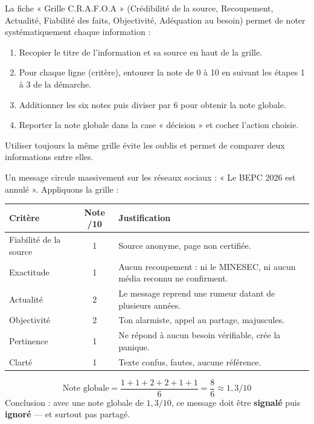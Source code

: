 \documentclass[11pt]{article}
\newcommand{\cle}[1]{{\popxbold\color{popdark}#1}}
\begin{document}
\begin{methode}
La fiche « Grille \cle{C.R.A.F.O.A} » (Crédibilité de la source, Recoupement, Actualité, Fiabilité des faits, Objectivité, Adéquation au besoin) permet de noter systématiquement chaque information :
\begin{enumerate}
  \item Recopier le titre de l'information et sa source en haut de la grille.
  \item Pour chaque ligne (critère), entourer la note de 0 à 10 en suivant les étapes 1 à 3 de la démarche.
  \item Additionner les six notes puis diviser par 6 pour obtenir la note globale.
  \item Reporter la note globale dans la case « décision » et cocher l'action choisie.
\end{enumerate}
Utiliser toujours la même grille évite les oublis et permet de comparer deux informations entre elles.
\end{methode}

\begin{exemplebox}
Un message circule massivement sur les réseaux sociaux : « Le BEPC 2026 est annulé ». Appliquons la grille :
\begin{center}
\begin{tabularx}{\linewidth}{|l|c|X|}
\hline
\rowcolor{popblueL} \textbf{Critère} & \textbf{Note /10} & \textbf{Justification} \\
\hline
Fiabilité de la source & 1 & Source anonyme, page non certifiée. \\
\hline
Exactitude & 1 & Aucun recoupement : ni le MINESEC, ni aucun média reconnu ne confirment. \\
\hline
Actualité & 2 & Le message reprend une rumeur datant de plusieurs années. \\
\hline
Objectivité & 2 & Ton alarmiste, appel au partage, majuscules. \\
\hline
Pertinence & 1 & Ne répond à aucun besoin vérifiable, crée la panique. \\
\hline
Clarté & 1 & Texte confus, fautes, aucune référence. \\
\hline
\end{tabularx}
\end{center}
\[
\text{Note globale} = \frac{1 + 1 + 2 + 2 + 1 + 1}{6} = \frac{8}{6} \approx 1{,}3/10
\]
Conclusion : avec une note globale de $1{,}3/10$, ce message doit être \textbf{signalé} puis \textbf{ignoré} — et surtout pas partagé.
\end{exemplebox}
\end{document}
